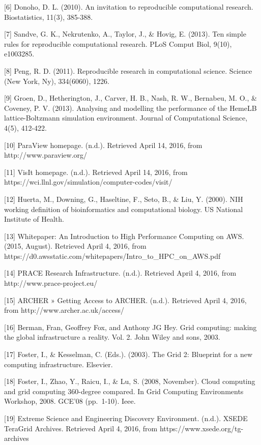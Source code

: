\documentclass[]{article}
\begin{document}
{[}6{]} Donoho, D. L. (2010). An invitation to reproducible
computational research. Biostatistics, 11(3), 385-388.

{[}7{]} Sandve, G. K., Nekrutenko, A., Taylor, J., \& Hovig, E. (2013).
Ten simple rules for reproducible computational research. PLoS Comput
Biol, 9(10), e1003285.

{[}8{]} Peng, R. D. (2011). Reproducible research in computational
science. Science (New York, Ny), 334(6060), 1226.

{[}9{]} Groen, D., Hetherington, J., Carver, H. B., Nash, R. W.,
Bernabeu, M. O., \& Coveney, P. V. (2013). Analysing and modelling the
performance of the HemeLB lattice-Boltzmann simulation environment.
Journal of Computational Science, 4(5), 412-422.

{[}10{]} ParaView homepage. (n.d.). Retrieved April 14, 2016, from
http://www.paraview.org/

{[}11{]} VisIt homepage. (n.d.). Retrieved April 14, 2016, from
https://wci.llnl.gov/simulation/computer-codes/visit/

{[}12{]} Huerta, M., Downing, G., Haseltine, F., Seto, B., \& Liu, Y.
(2000). NIH working definition of bioinformatics and computational
biology. US National Institute of Health.

{[}13{]} Whitepaper: An Introduction to High Performance Computing on
AWS. (2015, August). Retrieved April 4, 2016, from
https://d0.awsstatic.com/whitepapers/Intro\_to\_HPC\_on\_AWS.pdf

{[}14{]} PRACE Research Infrastructure. (n.d.). Retrieved April 4, 2016,
from http://www.prace-project.eu/

{[}15{]} ARCHER » Getting Access to ARCHER. (n.d.). Retrieved April 4,
2016, from http://www.archer.ac.uk/access/

{[}16{]} Berman, Fran, Geoffrey Fox, and Anthony JG Hey. Grid computing:
making the global infrastructure a reality. Vol. 2. John Wiley and sons,
2003.

{[}17{]} Foster, I., \& Kesselman, C. (Eds.). (2003). The Grid 2:
Blueprint for a new computing infrastructure. Elsevier.

{[}18{]} Foster, I., Zhao, Y., Raicu, I., \& Lu, S. (2008, November).
Cloud computing and grid computing 360-degree compared. In Grid
Computing Environments Workshop, 2008. GCE'08 (pp.~1-10). Ieee.

{[}19{]} Extreme Science and Engineering Discovery Environment. (n.d.).
XSEDE \textbar{} TeraGrid Archives. Retrieved April 4, 2016, from
https://www.xsede.org/tg-archives
\end{document}
